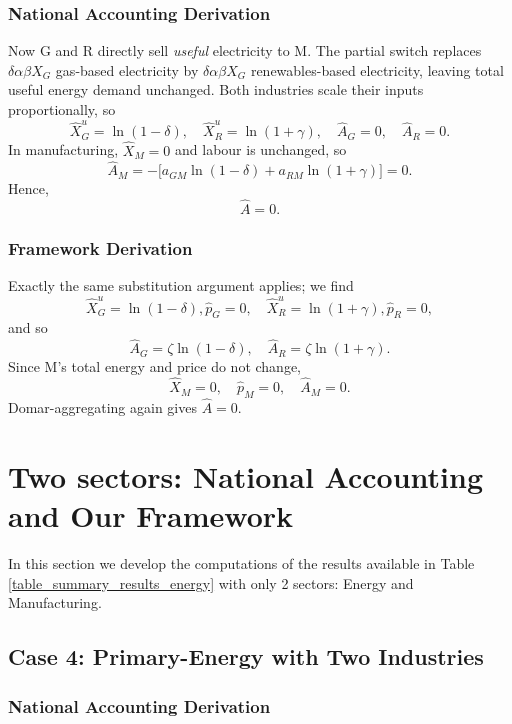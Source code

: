 \documentclass[11pt]{article}
\begin{document}
\subsubsection{National Accounting Derivation}

Now G and R directly sell \emph{useful} electricity to M. The partial switch replaces $\delta \alpha\beta X_G$ gas-based electricity by $\delta \alpha\beta X_G$ renewables-based electricity, leaving total useful energy demand unchanged. Both industries scale their inputs proportionally, so
\[
    \hat{X}_G^u
= \ln(1-\delta),
    \quad
    \hat{X}_R^u
= \ln(1+\gamma),
    \quad
    \hat{A}_G=0,
    \quad
    \hat{A}_R=0.
\]
In manufacturing, $\hat{X}_M=0$ and labour is unchanged, so
\[
   \hat{A}_M
= - \bigl[a_{GM}\ln(1-\delta)
       + a_{RM}\ln(1+\gamma)\bigr]
=0.
\]
Hence, 
\[
   \hat{A}=0.
\]

\subsubsection{Framework Derivation}

Exactly the same substitution argument applies; we find
\[
    \hat{X}_G^u
= \ln(1-\delta), \hat{p}_G=0,
    \quad
    \hat{X}_R^u
= \ln(1+\gamma), \hat{p}_R=0,
\]
and so
\[
    \hat{A}_G=\zeta \ln(1-\delta),
    \quad
    \hat{A}_R=\zeta \ln(1+\gamma).
\]
Since M's total energy and price do not change,
\[
    \hat{X}_M=0,\quad\hat{p}_M=0,\quad \hat{A}_M=0.
\]
Domar-aggregating again gives $\hat{A}=0$.

\section{Two sectors: National Accounting and Our Framework}


In this section we develop the computations of the results available in Table \ref{table_summary_results_energy} with only 2 sectors: Energy and Manufacturing.

\subsection{Case 4: Primary-Energy with Two Industries}
\label{subappendix_primary_energy_two_sectors}
\subsubsection{National Accounting Derivation}
\end{document}
